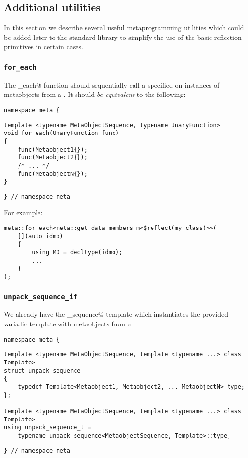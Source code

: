 \subsection{Additional utilities}
\label{fut-facade}

In this section we describe several useful metaprogramming utilities which
could be added later to the standard library to simplify the use of the basic
reflection primitives in certain cases.
 
\subsubsection{\texttt{for\_each}}
\label{fac-for-each}

The \verb@for_each@ function should sequentially call a specified
\verb@UnaryFunction@ on instances of metaobjects from
a . It should {\em be equivalent} to the following:

\begin{verbatim}
namespace meta {
\end{verbatim}
\begin{verbatim}
template <typename MetaObjectSequence, typename UnaryFunction>
void for_each(UnaryFunction func)
{
	func(Metaobject1{});
	func(Metaobject2{});
	/* ... */
	func(MetaobjectN{});
}
\end{verbatim}
\begin{verbatim}
} // namespace meta
\end{verbatim}

For example:

\begin{verbatim}
meta::for_each<meta::get_data_members_m<$reflect(my_class)>>(
	[](auto idmo)
	{
		using MO = decltype(idmo);
		...
	}
);
\end{verbatim}

\subsubsection{\texttt{unpack\_sequence\_if}}
\label{fac-unpack-sequence}

We already have the \verb@unpack_sequence@ template which instantiates
the provided variadic template with metaobjects from a .

\begin{verbatim}
namespace meta {
\end{verbatim}
\begin{verbatim}
template <typename MetaObjectSequence, template <typename ...> class Template>
struct unpack_sequence
{
	typedef Template<Metaobject1, Metaobject2, ... MetaobjectN> type;
};

template <typename MetaObjectSequence, template <typename ...> class Template>
using unpack_sequence_t =
	typename unpack_sequence<MetaobjectSequence, Template>::type;
\end{verbatim}
\begin{verbatim}
} // namespace meta
\end{verbatim}

